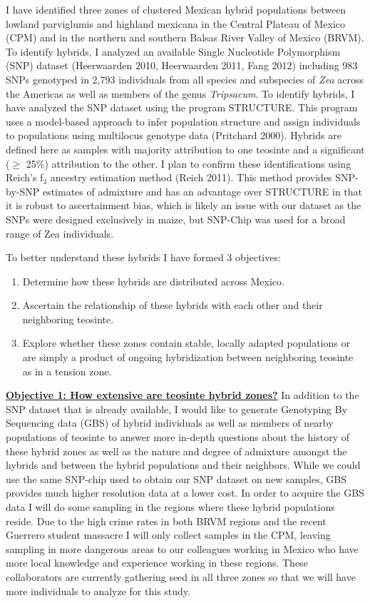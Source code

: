\documentclass[12pt]{amsart}
\begin{document}
I have identified three zones of clustered Mexican hybrid populations between lowland parviglumis and highland mexicana in the Central Plateau of Mexico (CPM) and in the northern and southern Balsas River Valley of Mexico (BRVM). 
To identify hybrids, I analyzed an available Single Nucleotide Polymorphism (SNP) dataset  (Heerwaarden 2010, Heerwaarden 2011, Fang 2012) including 983 SNPs genotyped in 2,793 individuals from all species and subspecies of \textit{Zea} across the Americas as well as members of the genus \textit{Tripsacum}.
To identify hybrids, I have analyzed the SNP dataset using the program STRUCTURE.
This program uses a model-based approach to infer population structure and assign individuals to populations using multilocus genotype data (Pritchard 2000).
Hybrids are defined here as samples with majority attribution to one teosinte and a significant ($\geq$ 25\%) attribution to the other.
I plan to confirm these identifications using Reich's f$_{\text{3}}$ ancestry estimation method (Reich  2011).  
This method provides SNP-by-SNP estimates of admixture and has an advantage over STRUCTURE in that it is robust to ascertainment bias, which is likely an issue with our dataset as the SNPs were designed exclusively in maize, but SNP-Chip was used for a broad range of Zea individuals.

To better understand these hybrids I have formed 3 objectives: 
\begin{enumerate} 
	\item Determine how these hybrids are distributed across Mexico.
	\item Ascertain the relationship of these hybrids with each other and their neighboring teosinte.
	\item Explore whether these zones contain stable, locally adapted populations or are simply a product of ongoing hybridization between neighboring teosinte as in a tension zone.
\end{enumerate} 

\hfill\break \textbf{\underline{Objective 1: How extensive are teosinte hybrid zones?} } 
In addition to the SNP dataset that is already available, I would like to generate Genotyping By Sequencing data (GBS) of hybrid individuals as well as members of nearby populations of teosinte to answer more in-depth questions about the history of these hybrid zones as well as the nature and degree of admixture amongst the hybrids and between the hybrid populations and their neighbors.  
While we could use the same SNP-chip used to obtain our SNP dataset on new samples, GBS provides much higher resolution data at a lower cost.
In order to acquire the GBS data I will do some sampling in the regions where these hybrid populations reside.  
Due to the high crime rates in both BRVM regions and the recent Guerrero student massacre I will only collect samples in the CPM, leaving sampling in more dangerous areas to our colleagues working in Mexico who have more local knowledge and experience working in these regions.
These collaborators are currently gathering seed in all three zones so that we will have more individuals to analyze for this study.
\end{document}
